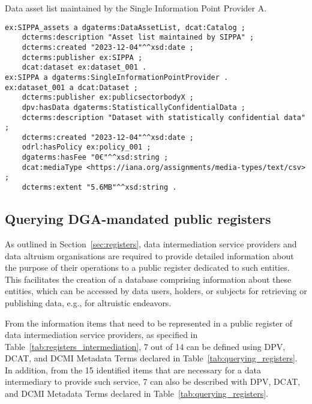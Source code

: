 \begin{listing}[ht]
\caption{Data asset list maintained by the Single Information Point Provider A.}
\label{list:data_asset_list}
\begin{verbatim}
ex:SIPPA_assets a dgaterms:DataAssetList, dcat:Catalog ;
    dcterms:description "Asset list maintained by SIPPA" ;
    dcterms:created "2023-12-04"^^xsd:date ;
    dcterms:publisher ex:SIPPA ;
    dcat:dataset ex:dataset_001 .
ex:SIPPA a dgaterms:SingleInformationPointProvider .
ex:dataset_001 a dcat:Dataset ;
    dcterms:publisher ex:publicsectorbodyX ;
    dpv:hasData dgaterms:StatisticallyConfidentialData ;
    dcterms:description "Dataset with statistically confidential data" ;
    dcterms:created "2023-12-04"^^xsd:date ; 
    odrl:hasPolicy ex:policy_001 ;
    dgaterms:hasFee "0€"^^xsd:string ;
    dcat:mediaType <https://iana.org/assignments/media-types/text/csv> ;
    dcterms:extent "5.6MB"^^xsd:string .
\end{verbatim}
\end{listing}

\subsection{Querying DGA-mandated public registers}
\label{sec:dga_registers}

As outlined in Section~\ref{sec:registers}, data intermediation service providers and data altruism organisations are required to provide detailed information about the purpose of their operations to a public register dedicated to such entities. 
This facilitates the creation of a database comprising information about these entities, which can be accessed by data users, holders, or subjects for retrieving or publishing data, e.g., for altruistic endeavors.

From the information items that need to be represented in a public register of data intermediation service providers, as specified in Table~\ref{tab:registers_intermediation}, 7 out of 14 can be defined using DPV, DCAT, and DCMI Metadata Terms declared in Table~\ref{tab:querying_registers}.
In addition, from the 15 identified items that are necessary for a data intermediary to provide such service, 7 can also be described with DPV, DCAT, and DCMI Metadata Terms declared in Table~\ref{tab:querying_registers}.

